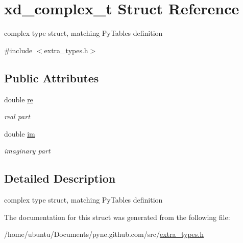 \hypertarget{structxd__complex__t}{}\section{xd\+\_\+complex\+\_\+t Struct Reference}
\label{structxd__complex__t}


complex type struct, matching Py\+Tables definition  




{\ttfamily \#include $<$extra\+\_\+types.\+h$>$}

\subsection*{Public Attributes}
\begin{DoxyCompactItemize}
\item 
double \hyperlink{structxd__complex__t_afbbb6ed1fe3b729258421cb3eaa8c4d8}{re}\hypertarget{structxd__complex__t_afbbb6ed1fe3b729258421cb3eaa8c4d8}{}\label{structxd__complex__t_afbbb6ed1fe3b729258421cb3eaa8c4d8}

\begin{DoxyCompactList}\small\item\em real part \end{DoxyCompactList}\item 
double \hyperlink{structxd__complex__t_afb1d09ccfa0e10044572c8a7bf4806f2}{im}\hypertarget{structxd__complex__t_afb1d09ccfa0e10044572c8a7bf4806f2}{}\label{structxd__complex__t_afb1d09ccfa0e10044572c8a7bf4806f2}

\begin{DoxyCompactList}\small\item\em imaginary part \end{DoxyCompactList}\end{DoxyCompactItemize}


\subsection{Detailed Description}
complex type struct, matching Py\+Tables definition 

The documentation for this struct was generated from the following file\+:\begin{DoxyCompactItemize}
\item 
/home/ubuntu/\+Documents/pyne.\+github.\+com/src/\hyperlink{extra__types_8h}{extra\+\_\+types.\+h}\end{DoxyCompactItemize}
